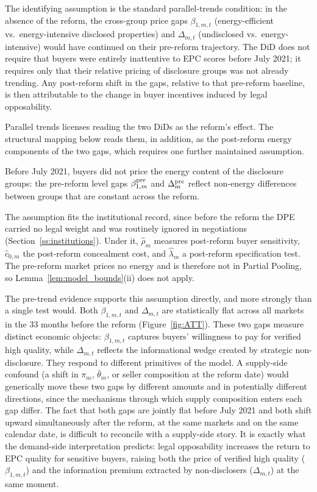 The identifying assumption is the standard parallel-trends condition: in the absence of the reform, the cross-group price gaps $\beta_{1,m,t}$ (energy-efficient vs.\ energy-intensive disclosed properties) and $\Delta_{m,t}$ (undisclosed vs.\ energy-intensive) would have continued on their pre-reform trajectory. The DiD does not require that buyers were entirely inattentive to EPC scores before July 2021; it requires only that their relative pricing of disclosure groups was not already trending. Any post-reform shift in the gaps, relative to that pre-reform baseline, is then attributable to the change in buyer incentives induced by legal opposability.

Parallel trends licenses reading the two DiDs as the reform's effect. The structural mapping below reads them, in addition, as the post-reform energy components of the two gaps, which requires one further maintained assumption.

\begin{assumption}
\label{assum:no_pre_pricing}
Before July 2021, buyers did not price the energy content of the disclosure groups: the pre-reform level gaps $\beta_{1,m}^{\rm pre}$ and $\Delta_m^{\rm pre}$ reflect non-energy differences between groups that are constant across the reform.
\end{assumption}

\noindent The assumption fits the institutional record, since before the reform the DPE carried no legal weight and was routinely ignored in negotiations (Section~\ref{ss:institutions}). Under it, $\hat\rho_m$ measures post-reform buyer sensitivity, $\hat c_{0,m}$ the post-reform concealment cost, and $\hat\lambda_m$ a post-reform specification test. The pre-reform market prices no energy and is therefore not in Partial Pooling, so Lemma~\ref{lem:model_bounds}(ii) does not apply.

The pre-trend evidence supports this assumption directly, and more strongly than a single test would. Both $\beta_{1,m,t}$ and $\Delta_{m,t}$ are statistically flat across all markets in the 33 months before the reform (Figure~\ref{fig:ATT}). These two gaps measure distinct economic objects: $\beta_{1,m,t}$ captures buyers' willingness to pay for verified high quality, while $\Delta_{m,t}$ reflects the informational wedge created by strategic non-disclosure. They respond to different primitives of the model. A supply-side confound (a shift in $\pi_m$, $\bar\theta_m$, or seller composition at the reform date) would generically move these two gaps by different amounts and in potentially different directions, since the mechanisms through which supply composition enters each gap differ. The fact that both gaps are jointly flat before July 2021 and both shift upward simultaneously after the reform, at the same markets and on the same calendar date, is difficult to reconcile with a supply-side story. It is exactly what the demand-side interpretation predicts: legal opposability increases the return to EPC quality for sensitive buyers, raising both the price of verified high quality ($\beta_{1,m,t}$) and the information premium extracted by non-disclosers ($\Delta_{m,t}$) at the same moment.

